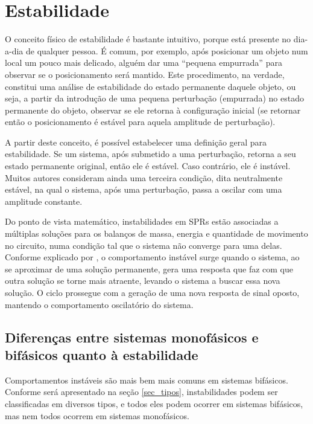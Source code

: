 \documentclass[a4paper,portuguese,10pt]{article}
\begin{document}
\section{Estabilidade\label{sec_estabilidade}}

O conceito físico de estabilidade é bastante intuitivo, porque está presente no dia-a-dia de qualquer pessoa. É comum, por exemplo, após posicionar um objeto num local um pouco mais delicado, alguém dar uma ``pequena empurrada'' para observar se o posicionamento será mantido. Este procedimento, na verdade, constitui uma análise de estabilidade do estado permanente daquele objeto, ou seja, a partir da introdução de uma pequena perturbação (empurrada) no estado permanente do objeto, observar se ele retorna à configuração inicial (se retornar então o posicionamento é estável para aquela amplitude de perturbação).

A partir deste conceito, é possível estabelecer uma definição geral para estabilidade. Se um sistema, após submetido a uma perturbação, retorna a seu estado permanente original, então ele é estável. Caso contrário, ele é instável. Muitos autores consideram ainda uma terceira condição, dita neutralmente estável, na qual o sistema, após uma perturbação, passa a oscilar com uma amplitude constante.

Do ponto de vista matemático, instabilidades em SPRs estão associadas a múltiplas soluções para os balanços de massa, energia e quantidade de movimento no circuito, numa condição tal que o sistema não converge para uma delas. Conforme explicado por \citet{VIJAYAN05b}, o comportamento instável surge quando o sistema, ao se aproximar de uma solução permanente, gera uma resposta que faz com que outra solução se torne mais atraente, levando o sistema a buscar essa nova solução. O ciclo prossegue com a geração de uma nova resposta de sinal oposto, mantendo o comportamento oscilatório do sistema.

\subsection{Diferenças entre sistemas monofásicos e bifásicos quanto à estabilidade}

Comportamentos instáveis são mais bem mais comuns em sistemas bifásicos. Conforme será apresentado na seção \ref{sec_tipos}, instabilidades podem ser classificadas em diversos tipos, e todos eles podem ocorrer em sistemas bifásicos, mas nem todos ocorrem em sistemas monofásicos.
\end{document}
